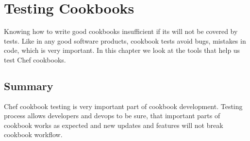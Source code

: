 \chapter{Testing Cookbooks}

Knowing how to write good cookbooks insufficient if its will not be covered by tests. Like in any good software products, cookbook tests avoid bugs, mistakes in code, which is very important. In this chapter we look at the tools that help us test Chef cookbooks.










\section{Summary}

Chef cookbook testing is very important part of cookbook development. Testing process allows developers and devops to be sure, that important parts of cookbook works as expected and new updates and features will not break cookbook workflow.
